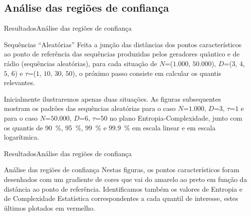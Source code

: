 \documentclass[10pt,xcolor={dvipsnames}]{beamer}
\begin{document}
\subsection{Análise das regiões de confiança}
\begin{frame}{Resultados}{Análise das regiões de confiança}
\begin{block}{Sequências ``Aleatórias''}
	Feita a junção das distâncias dos pontos característicos ao ponto de referência das sequências produzidas pelos geradores quântico e de rádio (sequências aleatórias), 
	para cada situação de $N$=($1.000$, $50.000$), $D$=($3$, $4$, $5$, $6$) e $\tau$=($1$, $10$, $30$, $50$), o próximo passo consiste em calcular os quantis relevantes.
	
	\pause
	Inicialmente ilustraremos apenas duas situações.
	As figuras subsequentes mostram os padrões das sequências aleatórias para o caso $N$=$1.000$, $D$=$3$, $\tau$=$1$ e para o caso $N$=$50.000$, $D$=$6$, $\tau$=$50$ no plano Entropia-Complexidade, junto com os quantis de \SI{90}{\percent}, \SI{95}{\percent}, \SI{99}{\percent} e \SI{99,9}{\percent} em escala linear e em escala logarítmica.
\end{block}
\end{frame}

\begin{frame}{Resultados}{Análise das regiões de confiança}
	\begin{block}{Análise das regiões de confiança}
		Nestas figuras, os pontos característicos foram desenhados com um gradiente de cores que vai do amarelo ao preto em função da distância ao ponto de referência.
		Identificamos também os valores de Entropia e de Complexidade Estatística correspondentes a cada quantil de interesse, estes últimos plotados em vermelho.
	\end{block}
\end{frame}
\end{document}
